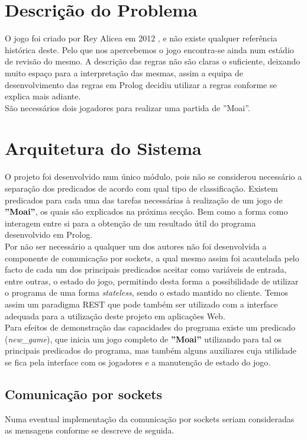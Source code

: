 \documentclass[15pt,a4paper]{article}
\begin{document}
\section{Descrição do Problema}
O jogo foi criado por Rey Alicea em 2012 \cite{gamegeek}, e não existe qualquer referência histórica deste. Pelo que nos apercebemos o jogo encontra-se ainda num estádio de revisão do mesmo. A descrição das regras \cite{blog, gamegeek} não são claras o suficiente, deixando muito espaço para a interpretação das mesmas, assim a equipa de desenvolvimento das regras em Prolog decidiu utilizar a regras conforme se explica mais adiante.
\\
São necessários dois jogadores para realizar uma partida de ''Moai''.

\section{Arquitetura do Sistema}
O projeto foi desenvolvido num único módulo, pois não se considerou necessário a separação dos predicados de acordo com qual tipo de classificação.
Existem predicados para cada uma das tarefas necessárias à realização de um jogo de \textbf{''Moai''}, os quais são explicados na próxima secção. Bem como a forma como interagem entre si para a obtenção de um resultado útil do programa desenvolvido em Prolog.\\

Por não ser necessário a qualquer um dos autores não foi desenvolvida a componente de comunicação por sockets, a qual mesmo assim foi acautelada pelo facto de cada um dos principais predicados aceitar como variáveis de entrada, entre outras, o estado do jogo, permitindo desta forma a possibilidade de utilizar o programa de uma forma \textit{stateless}, sendo o estado mantido no cliente. Temos assim um paradigma REST que pode também ser utilizado com a interface adequada para a utilização deste projeto em aplicações Web.\\

Para efeitos de demonstração das capacidades do programa existe um predicado (\textit{new\_game}), que inicia um jogo completo de \textbf{''Moai''} utilizando para tal os principais predicados do programa, mas também alguns auxiliares cuja utilidade se fica pela interface com os jogadores e a manutenção de estado do jogo.\\

\subsection{Comunicação por sockets}
Numa eventual implementação da comunicação por sockets seriam consideradas as mensagens conforme se descreve de seguida.\\
\end{document}
